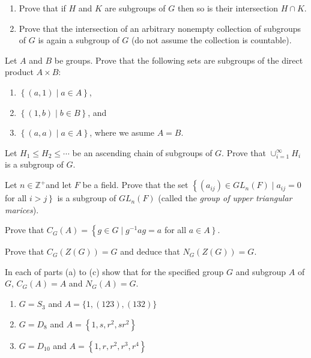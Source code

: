 \documentclass[
    11pt,a4paper,
]{exam}
\begin{document}
\begin{questions}
    
    \question
    \begin{enumerate}[label=(\alph*)]
        \item Prove that if \({H}\) and \({K}\) are subgroups of \(G\) then so is their intersection \(H \cap {K}\).
        \item Prove that the intersection of an arbitrary nonempty collection of subgroups of \(G\) is again a subgroup of \(G\) (do not assume the collection is countable).
    \end{enumerate}
    
    
    
    \question
    Let \(A\) and \(B\) be groups. Prove that the following sets are subgroups of the direct product \(A \times B\):
    \begin{enumerate}[label=(\alph*)]
        \item \(\left\{ (a,1) \mid a\in A \right\}\),
        \item \(\left\{ (1,b) \mid b\in B \right\}\), and
        \item \(\left\{ (a,a) \mid a\in A \right\}\), where we asume \(A= B\).
    \end{enumerate}
    
    
    
    
    \question
    Let \(H_1 \leq H_2 \leq \cdots\) be an ascending chain of subgroups of \(G\). Prove that \(\cup_{i=1}^{\infty} H_i\) is a subgroup of \(G\).
    
    \question
    Let \(n \in \mathbb{Z}^{+}\)and let \(F\) be a field. Prove that the set \(\left\{\left(a_{i j}\right) \in G L_n(F) \mid a_{i j}=0\right.\) for all \(\left.i>j\right\}\) is a subgroup of \(G L_n(F)\) (called the \textit{group of upper triangular marices}).
    
    
    
    \question
    Prove that \(C_G(A)=\left\{g \in G \mid g^{-1} a g=a\right.\) for all \(\left.a \in A\right\}\).
    
    \question
    Prove that \(C_G(Z(G))=G\) and deduce that \(N_G(Z(G))=G\).
    
    
    \question
    In each of parts (a) to (c) show that for the specified group \(G\) and subgroup \(A\) of \(G\), \(C_G(A)=A\) and \(N_G(A)=G\).
    \begin{enumerate}[label=(\alph*)]
        \item \(G=S_3\) and \(A=\{1,(123),(132)\}\)
        \item \(G=D_8\) and \(A=\left\{1, s, r^2, s r^2\right\}\)
        \item \(G=D_{10}\) and \(A=\left\{1, r, r^2, r^3, r^4\right\}\)
    \end{enumerate}
    

\end{questions}
\end{document}

